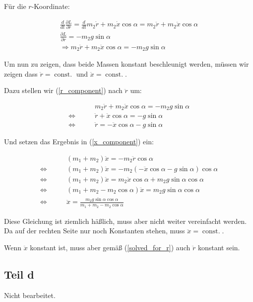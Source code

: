 \documentclass[a4paper,german,12pt,smallheadings]{scrartcl}
\begin{document}
Für die $r$-Koordinate:

\begin{align}
  \frac{d}{dt}\frac{\partial L}{\partial \dot{r}} = \frac{d}{dt} m_2\dot{r} + m_2\dot{x} \cos \alpha = m_2\ddot{r} + m_2\ddot{x} \cos \alpha \\
  \frac{\partial L}{\partial r} = -m_2g \sin \alpha \\
  \Rightarrow m_2\ddot{r} + m_2\ddot{x} \cos \alpha = -m_2g \sin \alpha
  \label{r_component}
\end{align}

Um nun zu zeigen, dass beide Massen konstant beschleunigt werden, müssen wir
zeigen dass $\ddot{r} = \operatorname{const.}$ und $\ddot{x} =
\operatorname{const.}$.

Dazu stellen wir (\ref{r_component}) nach $\ddot{r}$ um:

\begin{align}
  &m_2\ddot{r} + m_2\ddot{x} \cos \alpha = -m_2g \sin \alpha \\
  \Leftrightarrow \qquad &\ddot{r} + \ddot{x} \cos \alpha = -g \sin \alpha \\
  \Leftrightarrow \qquad &\ddot{r} = -\ddot{x} \cos \alpha -g \sin \alpha \label{solved_for_r}
\end{align}

Und setzen das Ergebnis in (\ref{x_component}) ein:

\begin{align*}
  &(m_1+m_2)\ddot{x} = -m_2 \ddot{r} \cos \alpha \\
  \Leftrightarrow \qquad &(m_1+m_2)\ddot{x} = -m_2 (-\ddot{x} \cos \alpha -g \sin \alpha) \cos \alpha \\
  \Leftrightarrow \qquad &(m_1+m_2)\ddot{x} = m_2 \ddot{x} \cos \alpha + m_2 g \sin \alpha \cos \alpha \\
  \Leftrightarrow \qquad &(m_1+m_2-m_2 \cos \alpha)\ddot{x} = m_2 g \sin \alpha \cos \alpha \\
  \Leftrightarrow \qquad &\ddot{x} = \frac{m_2 g \sin \alpha \cos \alpha}{m_1+m_2-m_2 \cos \alpha}
\end{align*}

Diese Gleichung ist ziemlich häßlich, muss aber nicht weiter vereinfacht
werden. Da auf der rechten Seite nur noch Konstanten stehen, muss $\ddot{x} =
\operatorname{const.}$.

Wenn $\ddot{x}$ konstant ist, muss aber gemäß (\ref{solved_for_r}) auch
$\ddot{r}$ konstant sein.


\subsection*{Teil d}
Nicht bearbeitet.
\end{document}
